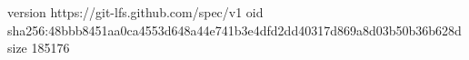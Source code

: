 version https://git-lfs.github.com/spec/v1
oid sha256:48bbb8451aa0ca4553d648a44e741b3e4dfd2dd40317d869a8d03b50b36b628d
size 185176
